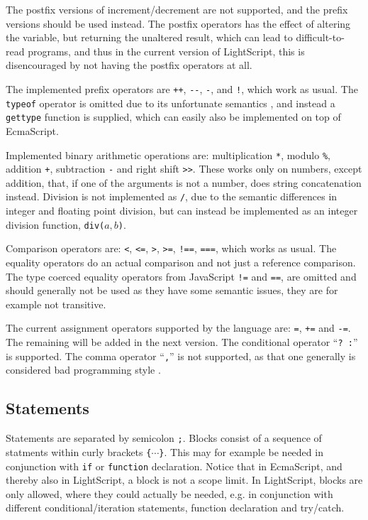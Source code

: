 \documentclass[11pt]{report}
\begin{document}
The postfix versions of increment/decrement are not supported, and the prefix versions should be used instead. The postfix operators has the effect of altering the variable, but returning the unaltered result, which can lead to difficult-to-read programs, and thus in the current version of LightScript, this is disencouraged by not having the postfix operators at all.

The implemented prefix operators are \verb|++|, \verb|--|, \verb|-|, and \verb|!|, which work as usual. The \verb|typeof| operator is omitted due to its unfortunate semantics \cite{crockford-web}, and instead a \verb|gettype| function is supplied, which can easily also be implemented on top of EcmaScript.

Implemented binary arithmetic operations are: multiplication \verb|*|, modulo \verb|%|, addition \verb|+|, subtraction \verb|-| and right shift \verb|>>|. These works only on numbers, except addition, that, if one of the arguments is not a number, does string concatenation instead.  Division \label{division} is not implemented as \verb|/|, due to the semantic differences in integer and floating point division, but can instead be implemented as an integer division function, \verb|div(|$a,b$\verb|)|. 

Comparison operators are: \verb|<|, \verb|<=|, \verb|>|, \verb|>=|, \verb|!==|, \verb|===|, which works as usual. The equality operators do an actual comparison and not just a reference comparison. 
The type coerced equality operators from JavaScript \verb|!=| and \verb|==|, are omitted and should generally not be used \cite{javascriptnoeqeq} as they have some semantic issues, they are for example not transitive.

The current assignment operators supported by the language are: \verb|=|, \verb|+=| and \verb|-=|.
The remaining will be added in the next version.
The conditional operator ``\verb|? :|'' is supported. The comma operator ``\verb|,|'' is not supported, as that one generally is considered bad programming style \cite{crockford-web}.

\subsection{Statements}
Statements are separated by semicolon \verb|;|.
Blocks consist of a sequence of statments within curly brackets \verb|{|$\cdots$\verb|}|. This may for example be needed in conjunction with \verb|if| or \verb|function| declaration. Notice that in EcmaScript, and thereby also in LightScript, a block is not a scope limit. In LightScript, blocks are only allowed, where they could actually be needed, e.g. in conjunction with different conditional/iteration statements, function declaration and try/catch.
\end{document}
